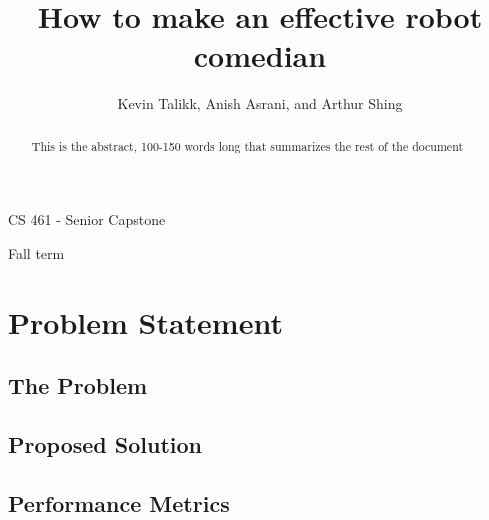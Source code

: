 \documentclass[journal, letterpaper, draftclsnofoot, onecolumn, 10pt]{IEEEtran}
\begin{document}
\title{How to make an effective robot comedian}
\author{Kevin Talikk, Anish Asrani, and Arthur Shing}

\begin{titlepage}
    \centering
    \maketitle
    CS 461 - Senior Capstone\par
    Fall term\par
    \vspace{1cm}
    \begin{abstract}
      This is the abstract, 100-150 words long that summarizes the rest of the document
    \end{abstract}


\end{titlepage}

\section{Problem Statement}

\subsection{The Problem}



\subsection{Proposed Solution}


\subsection{Performance Metrics}



\FloatBarrier
\end{document}
